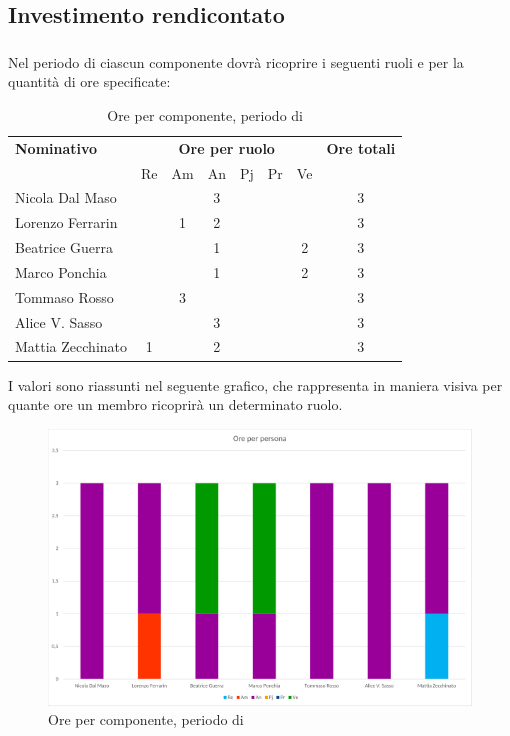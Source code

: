 \subsection{Investimento rendicontato}
\subsubsection{\AD}
Nel periodo di \AD{} ciascun componente dovrà ricoprire i seguenti ruoli e per la quantità di ore specificate:

\begin{table}[H]
	\centering
	\begin{tabular}{|l|c|c|c|c|c|c|c|}
		\hline
		\textbf{Nominativo} & 
		\multicolumn{6}{c|}{\textbf{Ore per ruolo}} & 
		\textbf{Ore totali} \\
		& Re & Am & An & Pj & Pr & Ve & \\
		\hline
		Nicola Dal Maso & & & 3 & & &  & 3 \\
		Lorenzo Ferrarin & & 1 & 2 & & &  & 3 \\
		Beatrice Guerra & & & 1 & & & 2 & 3 \\
		Marco Ponchia & & & 1 & & & 2 & 3 \\
		Tommaso Rosso & & 3 & & & & & 3 \\
		Alice V. Sasso & & & 3 & & & & 3 \\
		Mattia Zecchinato & 1 & & 2 & & & & 3 \\
		\hline
	\end{tabular}
	\caption{Ore per componente, periodo di \AD}
\end{table}
I valori sono riassunti nel seguente grafico, che rappresenta in maniera visiva per quante ore un membro ricoprirà un determinato ruolo.
\begin{figure}[H]
	\centering
	\includegraphics[width=14cm]{img_suddlavoro/AD.png}
	\caption{Ore per componente, periodo di \AD{}}
\end{figure}

